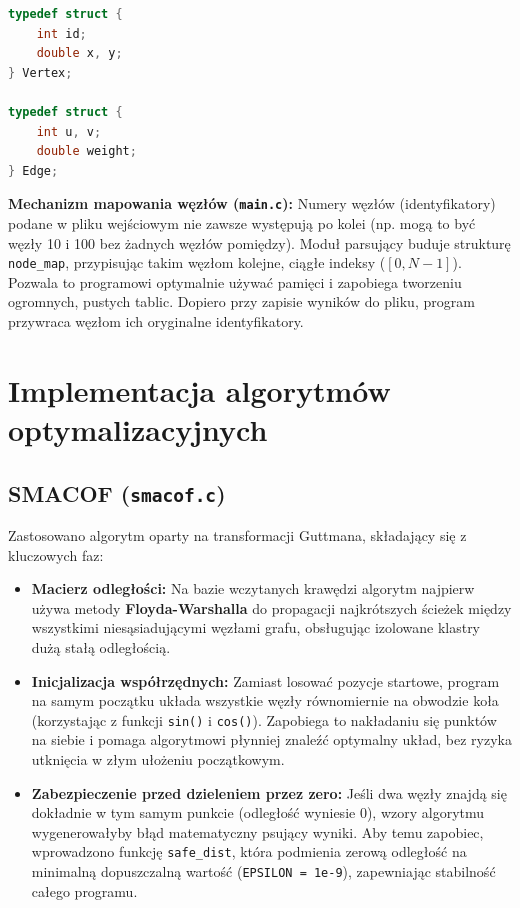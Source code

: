 \documentclass[12pt,a4paper]{article}
\begin{document}
\begin{lstlisting}[language=C]
typedef struct { 
    int id; 
    double x, y; 
} Vertex;

typedef struct { 
    int u, v; 
    double weight; 
} Edge;
\end{lstlisting}

\textbf{Mechanizm mapowania węzłów (\texttt{main.c}):} Numery węzłów (identyfikatory) podane w pliku wejściowym nie zawsze występują po kolei (np. mogą to być węzły 10 i 100 bez żadnych węzłów pomiędzy). Moduł parsujący buduje strukturę \texttt{node\_map}, przypisując takim węzłom kolejne, ciągłe indeksy ($[0, N-1]$). Pozwala to programowi optymalnie używać pamięci i zapobiega tworzeniu ogromnych, pustych tablic. Dopiero przy zapisie wyników do pliku, program przywraca węzłom ich oryginalne identyfikatory.

\section{Implementacja algorytmów optymalizacyjnych}

\subsection{SMACOF (\texttt{smacof.c})}
Zastosowano algorytm oparty na transformacji Guttmana, składający się z kluczowych faz:
\begin{itemize}
    \item \textbf{Macierz odległości:} Na bazie wczytanych krawędzi algorytm najpierw używa metody \textbf{Floyda-Warshalla} do propagacji najkrótszych ścieżek między wszystkimi niesąsiadującymi węzłami grafu, obsługując izolowane klastry dużą stałą odległością.
    \item \textbf{Inicjalizacja współrzędnych:} Zamiast losować pozycje startowe, program na samym początku układa wszystkie węzły równomiernie na obwodzie koła (korzystając z funkcji \texttt{sin()} i \texttt{cos()}). Zapobiega to nakładaniu się punktów na siebie i pomaga algorytmowi płynniej znaleźć optymalny układ, bez ryzyka utknięcia w złym ułożeniu początkowym.
    \item \textbf{Zabezpieczenie przed dzieleniem przez zero:} Jeśli dwa węzły znajdą się dokładnie w tym samym punkcie (odległość wyniesie 0), wzory algorytmu wygenerowałyby błąd matematyczny psujący wyniki. Aby temu zapobiec, wprowadzono funkcję \texttt{safe\_dist}, która podmienia zerową odległość na minimalną dopuszczalną wartość (\texttt{EPSILON = 1e-9}), zapewniając stabilność całego programu.
\end{itemize}
\end{document}
